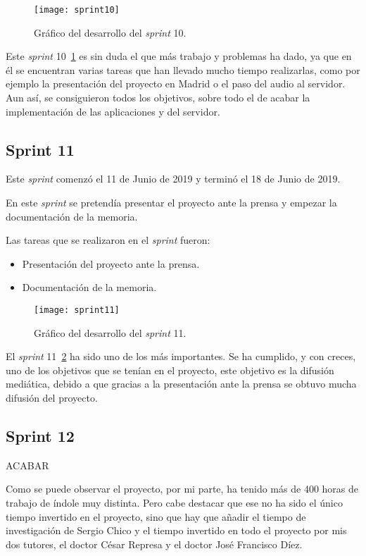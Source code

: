 \begin{figure}
	\centering
	\texttt{[image: sprint10]}
	\caption{Gráfico del desarrollo del \textit{sprint} 10.}
	\label{fig:sprint10}
\end{figure}

Este \textit{sprint} 10~\ref{fig:sprint10} es sin duda el que más trabajo y problemas ha dado, ya que en él se encuentran varias tareas que han llevado mucho tiempo realizarlas, como por ejemplo la presentación del proyecto en Madrid o el paso del audio al servidor. Aun así, se consiguieron todos los objetivos, sobre todo el de acabar la implementación de las aplicaciones y del servidor.

\subsection{Sprint 11}
Este \textit{sprint} comenzó el 11 de Junio de 2019 y terminó el 18 de Junio de 2019.

En este \textit{sprint} se pretendía presentar el proyecto ante la prensa y empezar la documentación de la memoria.

Las tareas que se realizaron en el \textit{sprint} fueron:
\begin{itemize}
	\item Presentación del proyecto ante la prensa.
	\item Documentación de la memoria.
\end{itemize}

\begin{figure}
	\centering
	\texttt{[image: sprint11]}
	\caption{Gráfico del desarrollo del \textit{sprint} 11.}
	\label{fig:sprint11}
\end{figure}

El \textit{sprint} 11~\ref{fig:sprint11} ha sido uno de los más importantes. Se ha cumplido, y con creces, uno de los objetivos que se tenían en el proyecto, este objetivo es la difusión mediática, debido a que gracias a la presentación ante la prensa se obtuvo mucha difusión del proyecto.

\subsection{Sprint 12}
ACABAR

Como se puede observar el proyecto, por mi parte, ha tenido más de 400 horas de trabajo de índole muy distinta. Pero cabe destacar que ese no ha sido el único tiempo invertido en el proyecto, sino que hay que añadir el tiempo de investigación de Sergio Chico y el tiempo invertido en todo el proyecto por mis dos tutores, el doctor César Represa y el doctor José Francisco Díez.
